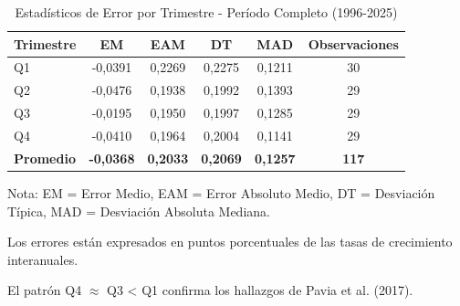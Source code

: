 \begin{table}[h!]
\centering
\caption{Estadísticos de Error por Trimestre - Período Completo (1996-2025)}
\label{tab:errores_trimestre}
    \begin{threeparttable}
        \begin{tabular}{lccccc}
            \toprule
            \textbf{Trimestre} & \textbf{EM} & \textbf{EAM} & \textbf{DT} & \textbf{MAD} & \textbf{Observaciones} \\
            \midrule
            Q1 & -0,0391 & 0,2269 & 0,2275 & 0,1211 & 30 \\
            Q2 & -0,0476 & 0,1938 & 0,1992 & 0,1393 & 29 \\
            Q3 & -0,0195 & 0,1950 & 0,1997 & 0,1285 & 29 \\
            Q4 & -0,0410 & 0,1964 & 0,2004 & 0,1141 & 29 \\
            \midrule
            \textbf{Promedio} & \textbf{-0,0368} & \textbf{0,2033} & \textbf{0,2069} & \textbf{0,1257} & \textbf{117} \\
            \bottomrule
        \end{tabular}
        \begin{tablenotes}
            \footnotesize
            \item Nota: EM = Error Medio, EAM = Error Absoluto Medio, DT = Desviación Típica, MAD = Desviación Absoluta Mediana.
            \item Los errores están expresados en puntos porcentuales de las tasas de crecimiento interanuales.
            \item El patrón Q4 $\approx$ Q3 < Q1 confirma los hallazgos de Pavia et al. (2017).
            \end{tablenotes}
    \end{threeparttable}
\end{table}